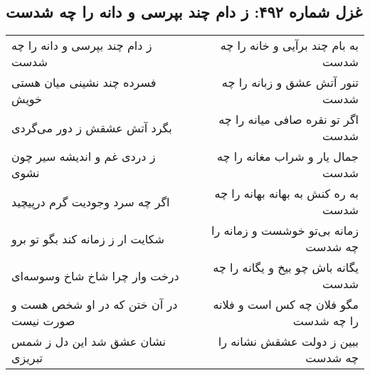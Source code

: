 \begin{center}
\section*{غزل شماره ۴۹۲: ز دام چند بپرسی و دانه را چه شدست}
\label{sec:0492}
\begin{longtable}{l p{0.5cm} r}
ز دام چند بپرسی و دانه را چه شدست
&&
به بام چند برآیی و خانه را چه شدست
\\
فسرده چند نشینی میان هستی خویش
&&
تنور آتش عشق و زبانه را چه شدست
\\
بگرد آتش عشقش ز دور می‌گردی
&&
اگر تو نقره صافی میانه را چه شدست
\\
ز دردی غم و اندیشه سیر چون نشوی
&&
جمال یار و شراب مغانه را چه شدست
\\
اگر چه سرد وجودیت گرم درپیچید
&&
به ره کنش به بهانه بهانه را چه شدست
\\
شکایت ار ز زمانه کند بگو تو برو
&&
زمانه بی‌تو خوشست و زمانه را چه شدست
\\
درخت وار چرا شاخ شاخ وسوسه‌ای
&&
یگانه باش چو بیخ و یگانه را چه شدست
\\
در آن ختن که در او شخص هست و صورت نیست
&&
مگو فلان چه کس است و فلانه را چه شدست
\\
نشان عشق شد این دل ز شمس تبریزی
&&
ببین ز دولت عشقش نشانه را چه شدست
\\
\end{longtable}
\end{center}
